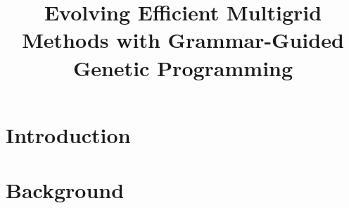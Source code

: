 \documentclass[
  paper = 17x24,
  language = english,
  acronym = split,
  acronymline = novertical,
  bibliography = split,
  bibliographypart = all,
  titlesize = Huge,
  par = halfskip,
]{faupress}
\title{Evolving Efficient Multigrid Methods with Grammar-Guided Genetic Programming}
\institute{Lehrstuhl für Informatik 10}
\begin{document}
\maketitle

\frontmatter
  
  \makefacultytitle

  \begin{preface}
   
    
  \end{preface}

  \tableofcontents

  \faupressprintacronyms
  
  \listoffigures
  
  \listoftables

\mainmatter

\chapter{Introduction}
    

\chapter{Background}
  

\appendix 
  
    
\backmatter

  \faupressprintbibliography
\end{document}

